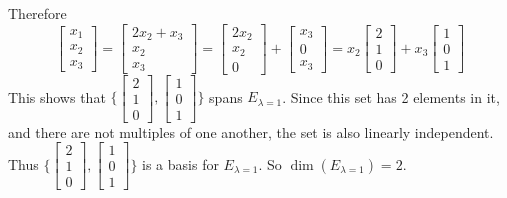 \documentclass[12pt]{article}
\begin{document}
\begin{example}
Therefore $$\begin{bmatrix} x_1 \\ x_2 \\ x_3 \end{bmatrix} = \begin{bmatrix} 2x_2 + x_3 \\ x_2 \\ x_3 \end{bmatrix} = \begin{bmatrix} 2x_2 \\ x_2 \\ 0 \end{bmatrix} + \begin{bmatrix} x_3 \\ 0 \\ x_3 \end{bmatrix} = x_2\begin{bmatrix} 2 \\ 1 \\ 0 \end{bmatrix} + x_3\begin{bmatrix} 1 \\ 0 \\ 1 \end{bmatrix} $$ This shows that $\{\begin{bmatrix} 2 \\ 1 \\ 0 \end{bmatrix}, \begin{bmatrix} 1 \\ 0 \\ 1 \end{bmatrix}\}$ spans $E_{\lambda = 1}$. Since this set has 2 elements in it, and there are not multiples of one another, the set is also linearly independent. Thus $\{\begin{bmatrix} 2 \\ 1 \\ 0 \end{bmatrix}, \begin{bmatrix} 1 \\ 0 \\ 1 \end{bmatrix}\}$ is a basis for $E_{\lambda = 1}$. So $\dim(E_{\lambda = 1}) = 2$. \newline 

\end{example}
\end{document}
